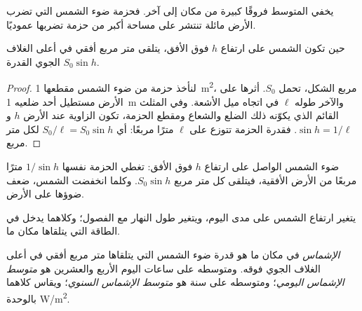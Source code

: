 يخفي المتوسط فروقًا كبيرة من مكان إلى آخر. فحزمة ضوء الشمس التي تضرب الأرض
مائلة تنتشر على مساحة أكبر من حزمة تضربها عموديًا.

\begin{proposition}\label{prop:g10:earth-energy-budget:height}
حين تكون الشمس على ارتفاع $h$ فوق الأفق، يتلقى متر مربع أفقي في أعلى الغلاف
الجوي القدرة $S_0 \sin h$.
\end{proposition}

\begin{proof}
لنأخذ حزمة من ضوء الشمس مقطعها \qty{1}{m^2}، مربع الشكل، تحمل
$S_0$. أثرها على الأرض مستطيل أحد ضلعيه \qty{1}{m}
والآخر طوله $\ell$ في اتجاه ميل الأشعة. وفي المثلث القائم الذي يكوّنه ذلك
الضلع والشعاع ومقطع الحزمة، تكون الزاوية عند الأرض $h$ و$\sin h = 1/\ell$.
فقدرة الحزمة تتوزع على $\ell$ مترًا مربعًا: أي $S_0/\ell = S_0 \sin h$ لكل متر
مربع.
\end{proof}

\begin{omfigure}

{\small ضوء الشمس الواصل على ارتفاع $h$ فوق الأفق: تغطي الحزمة نفسها
$1/\sin h$ مترًا مربعًا من الأرض الأفقية، فيتلقى كل متر مربع $S_0 \sin h$.
وكلما انخفضت الشمس، ضعف ضوؤها على
الأرض.}
\end{omfigure}

يتغير ارتفاع الشمس على مدى اليوم، ويتغير طول النهار مع الفصول؛ وكلاهما يدخل في
الطاقة التي يتلقاها مكان ما.

\begin{definition}[الإشماس]\label{def:g10:earth-energy-budget:insolation}
\emph{الإشماس} في مكان ما هو قدرة ضوء الشمس التي يتلقاها متر مربع
أفقي في أعلى الغلاف الجوي فوقه. ومتوسطه على ساعات اليوم الأربع والعشرين هو
\emph{متوسط الإشماس اليومي}؛ ومتوسطه على سنة هو \emph{متوسط الإشماس السنوي}؛
ويقاس كلاهما بالوحدة \unit{W/m^2}.
\end{definition}

